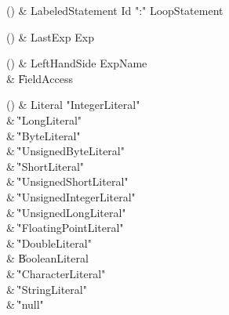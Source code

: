 \begin{bbgrammarappendix}

() & LabeledStatement \label{prod:LabeledStatement}  \: Id \xcd":" LoopStatement  \\


\end{bbgrammarappendix}

\begin{bbgrammarappendix}

() & LastExp \label{prod:LastExp}  \: Exp  \\


\end{bbgrammarappendix}

\begin{bbgrammarappendix}

() & LeftHandSide \label{prod:LeftHandSide}  \: ExpName  \\

 &    \| FieldAccess \\

\end{bbgrammarappendix}

\begin{bbgrammarappendix}

() & Literal \label{prod:Literal}  \: \xcd"IntegerLiteral"   \\

 &    \| \xcd"LongLiteral"  \\
 &    \| \xcd"ByteLiteral" \\
 &    \| \xcd"UnsignedByteLiteral" \\
 &    \| \xcd"ShortLiteral" \\
 &    \| \xcd"UnsignedShortLiteral" \\
 &    \| \xcd"UnsignedIntegerLiteral"  \\
 &    \| \xcd"UnsignedLongLiteral"  \\
 &    \| \xcd"FloatingPointLiteral"  \\
 &    \| \xcd"DoubleLiteral"  \\
 &    \| BooleanLiteral \\
 &    \| \xcd"CharacterLiteral"  \\
 &    \| \xcd"StringLiteral"  \\
 &    \| \xcd"null" \\

\end{bbgrammarappendix}

